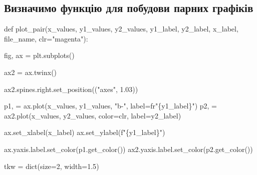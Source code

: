 \documentclass[
  letterpaper,
]{report}
\newenvironment{Shaded}{\begin{snugshade}}{\end{snugshade}}
\newcommand{\BuiltInTok}[1]{\textcolor[rgb]{0.00,0.23,0.31}{#1}}
\newcommand{\DecValTok}[1]{\textcolor[rgb]{0.68,0.00,0.00}{#1}}
\newcommand{\FloatTok}[1]{\textcolor[rgb]{0.68,0.00,0.00}{#1}}
\newcommand{\KeywordTok}[1]{\textcolor[rgb]{0.00,0.23,0.31}{#1}}
\newcommand{\NormalTok}[1]{\textcolor[rgb]{0.00,0.23,0.31}{#1}}
\newcommand{\OperatorTok}[1]{\textcolor[rgb]{0.37,0.37,0.37}{#1}}
\newcommand{\SpecialCharTok}[1]{\textcolor[rgb]{0.37,0.37,0.37}{#1}}
\newcommand{\SpecialStringTok}[1]{\textcolor[rgb]{0.13,0.47,0.30}{#1}}
\newcommand{\StringTok}[1]{\textcolor[rgb]{0.13,0.47,0.30}{#1}}
\newcommand{\VerbatimStringTok}[1]{\textcolor[rgb]{0.13,0.47,0.30}{#1}}
\begin{document}
\hypertarget{ux432ux438ux437ux43dux430ux447ux438ux43cux43e-ux444ux443ux43dux43aux446ux456ux44e-ux434ux43bux44f-ux43fux43eux431ux443ux434ux43eux432ux438-ux43fux430ux440ux43dux438ux445-ux433ux440ux430ux444ux456ux43aux456ux432}{%
\subsection{Визначимо функцію для побудови парних
графіків}\label{ux432ux438ux437ux43dux430ux447ux438ux43cux43e-ux444ux443ux43dux43aux446ux456ux44e-ux434ux43bux44f-ux43fux43eux431ux443ux434ux43eux432ux438-ux43fux430ux440ux43dux438ux445-ux433ux440ux430ux444ux456ux43aux456ux432}}

\begin{Shaded}
\begin{Highlighting}[]
\KeywordTok{def}\NormalTok{ plot\_pair(x\_values, }
\NormalTok{              y1\_values,}
\NormalTok{              y2\_values,  }
\NormalTok{              y1\_label, }
\NormalTok{              y2\_label,}
\NormalTok{              x\_label, }
\NormalTok{              file\_name, clr}\OperatorTok{=}\StringTok{"magenta"}\NormalTok{):}

\NormalTok{    fig, ax }\OperatorTok{=}\NormalTok{ plt.subplots()}

\NormalTok{    ax2 }\OperatorTok{=}\NormalTok{ ax.twinx()}

\NormalTok{    ax2.spines.right.set\_position((}\StringTok{"axes"}\NormalTok{, }\FloatTok{1.03}\NormalTok{))}

\NormalTok{    p1, }\OperatorTok{=}\NormalTok{ ax.plot(x\_values, }
\NormalTok{                  y1\_values, }
                  \StringTok{"b{-}"}\NormalTok{, label}\OperatorTok{=}\VerbatimStringTok{fr"}\SpecialCharTok{\{}\NormalTok{y1\_label}\SpecialCharTok{\}}\VerbatimStringTok{"}\NormalTok{)}
\NormalTok{    p2, }\OperatorTok{=}\NormalTok{ ax2.plot(x\_values,}
\NormalTok{                   y2\_values, }
\NormalTok{                   color}\OperatorTok{=}\NormalTok{clr, }
\NormalTok{                   label}\OperatorTok{=}\NormalTok{y2\_label)}

\NormalTok{    ax.set\_xlabel(x\_label)}
\NormalTok{    ax.set\_ylabel(}\SpecialStringTok{f"}\SpecialCharTok{\{}\NormalTok{y1\_label}\SpecialCharTok{\}}\SpecialStringTok{"}\NormalTok{)}

\NormalTok{    ax.yaxis.label.set\_color(p1.get\_color())}
\NormalTok{    ax2.yaxis.label.set\_color(p2.get\_color())}

\NormalTok{    tkw }\OperatorTok{=} \BuiltInTok{dict}\NormalTok{(size}\OperatorTok{=}\DecValTok{2}\NormalTok{, width}\OperatorTok{=}\FloatTok{1.5}\NormalTok{)}


\end{Highlighting}
\end{Shaded}
\end{document}
